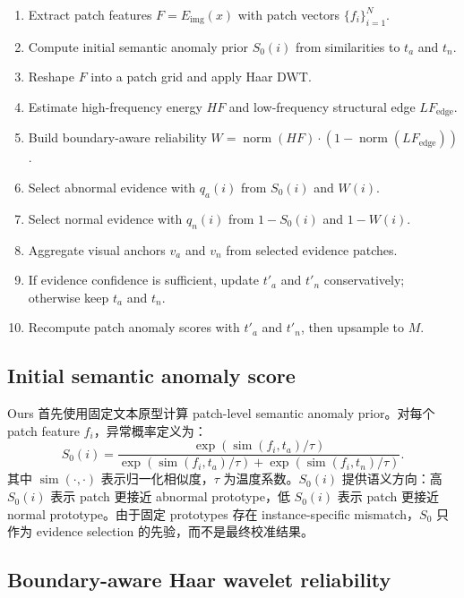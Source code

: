 \documentclass[10pt,a4paper,fontset=none]{ctexart}
\newcommand{\simi}{\operatorname{sim}}
\newcommand{\normop}{\operatorname{norm}}
\begin{document}
\begin{table}[t]
\small
{}
\label{alg:ours}
\begin{enumerate}[leftmargin=1.5em]
  \item Extract patch features $F=E_{\mathrm{img}}(x)$ with patch vectors $\{f_i\}_{i=1}^{N}$.
  \item Compute initial semantic anomaly prior $S_0(i)$ from similarities to $t_a$ and $t_n$.
  \item Reshape $F$ into a patch grid and apply Haar DWT.
  \item Estimate high-frequency energy $HF$ and low-frequency structural edge $LF_{\mathrm{edge}}$.
  \item Build boundary-aware reliability $W = \normop(HF)\cdot(1-\normop(LF_{\mathrm{edge}}))$.
  \item Select abnormal evidence with $q_a(i)$ from $S_0(i)$ and $W(i)$.
  \item Select normal evidence with $q_n(i)$ from $1-S_0(i)$ and $1-W(i)$.
  \item Aggregate visual anchors $v_a$ and $v_n$ from selected evidence patches.
  \item If evidence confidence is sufficient, update $t'_a$ and $t'_n$ conservatively; otherwise keep $t_a$ and $t_n$.
  \item Recompute patch anomaly scores with $t'_a$ and $t'_n$, then upsample to $M$.
\end{enumerate}
\end{table}

\subsection{Initial semantic anomaly score}

Ours 首先使用固定文本原型计算 patch-level semantic anomaly prior。对每个 patch feature $f_i$，异常概率定义为：
\begin{equation}
S_0(i)=
\frac{\exp(\simi(f_i,t_a)/\tau)}
{\exp(\simi(f_i,t_a)/\tau)+\exp(\simi(f_i,t_n)/\tau)} .
\label{eq:s0}
\end{equation}
其中 $\simi(\cdot,\cdot)$ 表示归一化相似度，$\tau$ 为温度系数。$S_0(i)$ 提供语义方向：高 $S_0(i)$ 表示 patch 更接近 abnormal prototype，低 $S_0(i)$ 表示 patch 更接近 normal prototype。由于固定 prototypes 存在 instance-specific mismatch，$S_0$ 只作为 evidence selection 的先验，而不是最终校准结果。

\subsection{Boundary-aware Haar wavelet reliability}
\end{document}
